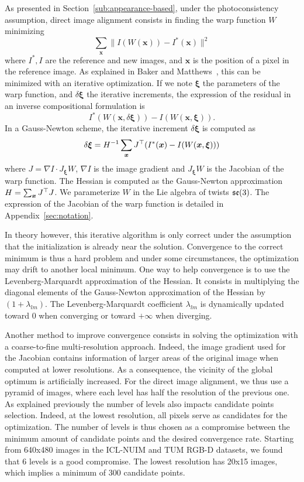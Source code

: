 As presented in Section~\ref{sub:appearance-based},
under the photoconsistency assumption, direct image alignment consists
in finding the warp function $W$ minimizing
\[
	\sum_{\bm{x}}\|I(W(\bm{x})) - I^{*}(\bm{x})\|^2
\]
where $I^{*}, I$ are the reference and new images,
and $\bm{x}$ is the position of a pixel in the reference image.
As explained in Baker and Matthews~\cite{baker2004lucas},
this can be minimized with an iterative optimization.
If we note $\bm{\xi}$ the parameters of the warp function,
and $\delta\bm{\xi}$ the iterative increments,
the expression of the residual in an inverse compositional formulation is
\[
	I^{*}(W(\bm{x}, \delta \bm{\xi})) - I(W(\bm{x}, \bm{\xi})).
\]
In a Gauss-Newton scheme, the iterative increment $\delta\bm{\xi}$ is computed as
\[
	\delta \bm{\xi} = H^{-1} \sum_{\bm{x}} J^{\top} (I^{*}(\bm{x}) - I(W(\bm{x}, \bm{\xi})))
\]
where $J = \nabla I \cdot J_{\bm{\xi}}W$, $\nabla I$ is the image gradient
and $J_{\bm{\xi}}W$ is the Jacobian of the warp function.
The Hessian is computed as the Gauss-Newton approximation
$H = \sum_{\bm{x}}J^{\top}J$.
We parameterize $W$ in the Lie algebra of twists $\mathfrak{se}(3)$.
The expression of the Jacobian of the warp function
is detailed in Appendix~\ref{sec:notation}.

In theory however, this iterative algorithm is only correct under the assumption
that the initialization is already near the solution.
Convergence to the correct minimum is thus a hard problem
and under some circumstances, the optimization may drift to another local minimum.
One way to help convergence is to use the Levenberg-Marquardt approximation
of the Hessian.
It consists in multiplying the diagonal elements of
the Gauss-Newton approximation of the Hessian by $(1 + \lambda_{lm})$.
The Levenberg-Marquardt coefficient $\lambda_{lm}$ is dynamically
updated toward 0 when converging or toward $+\infty$ when diverging.

Another method to improve convergence consists in solving the optimization
with a coarse-to-fine multi-resolution approach.
Indeed, the image gradient used for the Jacobian contains information
of larger areas of the original image when computed at lower resolutions.
As a consequence, the vicinity of the global optimum is artificially increased.
For the direct image alignment, we thus use a pyramid of images,
where each level has half the resolution of the previous one.
As explained previously the number of levels also impacts candidate points selection.
Indeed, at the lowest resolution, all pixels serve as candidates for the optimization.
The number of levels is thus chosen as a compromise between the minimum amount
of candidate points and the desired convergence rate.
Starting from 640x480 images in the ICL-NUIM and TUM RGB-D datasets,
we found that 6 levels is a good compromise.
The lowest resolution has 20x15 images, which implies a minimum of 300 candidate points.


